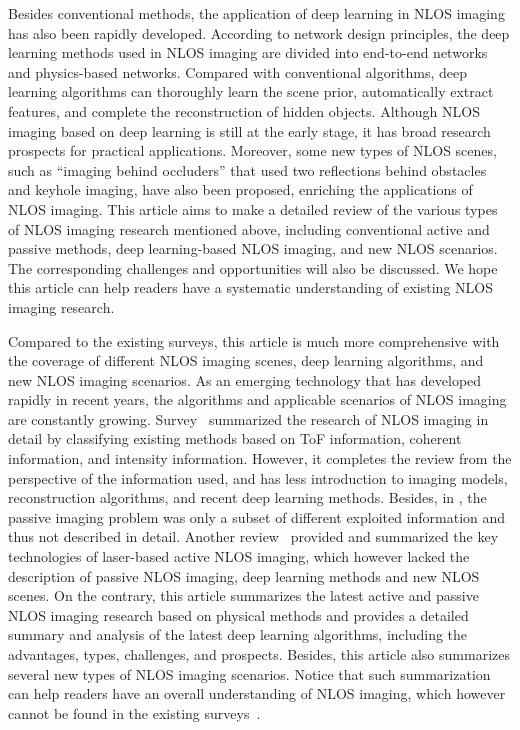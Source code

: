 Besides conventional methods, the application of deep learning in NLOS imaging has also been rapidly developed. According to network design principles, the deep learning methods used in NLOS imaging are divided into end-to-end networks\cite{chopiteDeepNonLineofSightReconstruction2020} and physics-based networks\cite{chen_learned_2020,metzlerDeepinverseCorrelographyRealtime2020}. Compared with conventional algorithms, deep learning algorithms can thoroughly learn the scene prior, automatically extract features, and complete the reconstruction of hidden objects. Although NLOS imaging based on deep learning is still at the early stage, it has broad research prospects for practical applications.
Moreover, some new types of NLOS scenes, such as “imaging behind occluders” \cite{vedaldi_imaging_2020} that used two reflections behind obstacles and keyhole imaging\cite{metzler_keyhole_2021}, have also been proposed, enriching the applications of NLOS imaging. This article aims to make a detailed review of the various types of NLOS imaging research mentioned above, including conventional active and passive methods, deep learning-based NLOS imaging, and new NLOS scenarios. The corresponding challenges and opportunities will also be discussed. We hope this article can help readers have a systematic understanding of existing NLOS imaging research.

Compared to the existing surveys\cite{maedaRecentAdvancesImaging2019,faccioNonlineofsightImaging2020}, this article is much more comprehensive with the coverage of different NLOS imaging scenes, deep learning algorithms, and new NLOS imaging scenarios. As an emerging technology that has developed rapidly in recent years, the algorithms and applicable scenarios of NLOS imaging are constantly growing. Survey~\cite{maedaRecentAdvancesImaging2019} summarized the research of NLOS imaging in detail by classifying existing methods based on ToF information, coherent information, and intensity information. However, it completes the review from the perspective of the information used, and has less introduction to imaging models, reconstruction algorithms, and recent deep learning methods. Besides, in \cite{maedaRecentAdvancesImaging2019}, the passive imaging problem was only a subset of different exploited information and thus not described in detail. Another review~\cite{faccioNonlineofsightImaging2020} provided and summarized the key technologies of laser-based active NLOS imaging, which however lacked the description of passive NLOS imaging, deep learning methods and new NLOS scenes. On the contrary, this article summarizes the latest active and passive NLOS imaging research based on physical methods and provides a detailed summary and analysis of the latest deep learning algorithms, including the advantages, types, challenges, and prospects. Besides, this article also summarizes several new types of NLOS imaging scenarios. Notice that such summarization can help readers have an overall understanding of NLOS imaging, which however cannot be found in the existing surveys~\cite{maedaRecentAdvancesImaging2019, faccioNonlineofsightImaging2020}.

